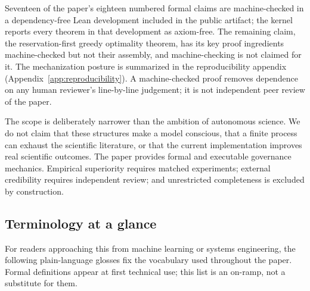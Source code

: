 Seventeen of the paper's eighteen numbered formal claims are machine-checked in a dependency-free Lean development included in the public artifact; the kernel reports every theorem in that development as axiom-free. The remaining claim, the reservation-first greedy optimality theorem, has its key proof ingredients machine-checked but not their assembly, and machine-checking is not claimed for it. The mechanization posture is summarized in the reproducibility appendix (Appendix~\ref{app:reproducibility}). A machine-checked proof removes dependence on any human reviewer's line-by-line judgement; it is not independent peer review of the paper.

The scope is deliberately narrower than the ambition of autonomous science. We do not claim that these structures make a model conscious, that a finite process can exhaust the scientific literature, or that the current implementation improves real scientific outcomes. The paper provides formal and executable governance mechanics. Empirical superiority requires matched experiments; external credibility requires independent review; and unrestricted completeness is excluded by construction.

\subsection{Terminology at a glance}
\label{sec:glossary}

For readers approaching this from machine learning or systems engineering, the following plain-language glosses fix the vocabulary used throughout the paper. Formal definitions appear at first technical use; this list is an on-ramp, not a substitute for them.

